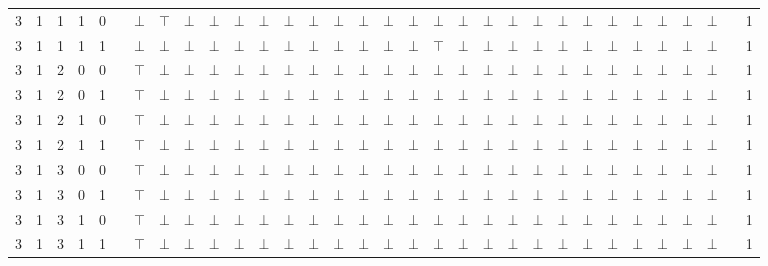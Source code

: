 \documentclass[12pt]{extarticle}
\begin{document}
\begin{landscape}
\begin{tiny}
\begin{longtable}[c]{llllllllllllllllllllllllllllllll}
3 & 1 & 1 & 1 & 0 &  & $\bot$ & $\top$ & $\bot$ & $\bot$ & $\bot$ & $\bot$ & $\bot$ & $\bot$ & $\bot$ & $\bot$ & $\bot$ & $\bot$ & $\bot$ & $\bot$ & $\bot$ & $\bot$ & $\bot$ & $\bot$ & $\bot$ & $\bot$ & $\bot$ & $\bot$ & $\bot$ & $\bot$ &  & 1 \\
3 & 1 & 1 & 1 & 1 &  & $\bot$ & $\bot$ & $\bot$ & $\bot$ & $\bot$ & $\bot$ & $\bot$ & $\bot$ & $\bot$ & $\bot$ & $\bot$ & $\bot$ & $\top$ & $\bot$ & $\bot$ & $\bot$ & $\bot$ & $\bot$ & $\bot$ & $\bot$ & $\bot$ & $\bot$ & $\bot$ & $\bot$ &  & 1 \\
3 & 1 & 2 & 0 & 0 &  & $\top$ & $\bot$ & $\bot$ & $\bot$ & $\bot$ & $\bot$ & $\bot$ & $\bot$ & $\bot$ & $\bot$ & $\bot$ & $\bot$ & $\bot$ & $\bot$ & $\bot$ & $\bot$ & $\bot$ & $\bot$ & $\bot$ & $\bot$ & $\bot$ & $\bot$ & $\bot$ & $\bot$ &  & 1 \\
3 & 1 & 2 & 0 & 1 &  & $\top$ & $\bot$ & $\bot$ & $\bot$ & $\bot$ & $\bot$ & $\bot$ & $\bot$ & $\bot$ & $\bot$ & $\bot$ & $\bot$ & $\bot$ & $\bot$ & $\bot$ & $\bot$ & $\bot$ & $\bot$ & $\bot$ & $\bot$ & $\bot$ & $\bot$ & $\bot$ & $\bot$ &  & 1 \\
3 & 1 & 2 & 1 & 0 &  & $\top$ & $\bot$ & $\bot$ & $\bot$ & $\bot$ & $\bot$ & $\bot$ & $\bot$ & $\bot$ & $\bot$ & $\bot$ & $\bot$ & $\bot$ & $\bot$ & $\bot$ & $\bot$ & $\bot$ & $\bot$ & $\bot$ & $\bot$ & $\bot$ & $\bot$ & $\bot$ & $\bot$ &  & 1 \\
3 & 1 & 2 & 1 & 1 &  & $\top$ & $\bot$ & $\bot$ & $\bot$ & $\bot$ & $\bot$ & $\bot$ & $\bot$ & $\bot$ & $\bot$ & $\bot$ & $\bot$ & $\bot$ & $\bot$ & $\bot$ & $\bot$ & $\bot$ & $\bot$ & $\bot$ & $\bot$ & $\bot$ & $\bot$ & $\bot$ & $\bot$ &  & 1 \\
3 & 1 & 3 & 0 & 0 &  & $\top$ & $\bot$ & $\bot$ & $\bot$ & $\bot$ & $\bot$ & $\bot$ & $\bot$ & $\bot$ & $\bot$ & $\bot$ & $\bot$ & $\bot$ & $\bot$ & $\bot$ & $\bot$ & $\bot$ & $\bot$ & $\bot$ & $\bot$ & $\bot$ & $\bot$ & $\bot$ & $\bot$ &  & 1 \\
3 & 1 & 3 & 0 & 1 &  & $\top$ & $\bot$ & $\bot$ & $\bot$ & $\bot$ & $\bot$ & $\bot$ & $\bot$ & $\bot$ & $\bot$ & $\bot$ & $\bot$ & $\bot$ & $\bot$ & $\bot$ & $\bot$ & $\bot$ & $\bot$ & $\bot$ & $\bot$ & $\bot$ & $\bot$ & $\bot$ & $\bot$ &  & 1 \\
3 & 1 & 3 & 1 & 0 &  & $\top$ & $\bot$ & $\bot$ & $\bot$ & $\bot$ & $\bot$ & $\bot$ & $\bot$ & $\bot$ & $\bot$ & $\bot$ & $\bot$ & $\bot$ & $\bot$ & $\bot$ & $\bot$ & $\bot$ & $\bot$ & $\bot$ & $\bot$ & $\bot$ & $\bot$ & $\bot$ & $\bot$ &  & 1 \\
3 & 1 & 3 & 1 & 1 &  & $\top$ & $\bot$ & $\bot$ & $\bot$ & $\bot$ & $\bot$ & $\bot$ & $\bot$ & $\bot$ & $\bot$ & $\bot$ & $\bot$ & $\bot$ & $\bot$ & $\bot$ & $\bot$ & $\bot$ & $\bot$ & $\bot$ & $\bot$ & $\bot$ & $\bot$ & $\bot$ & $\bot$ &  & 1 \\

\end{longtable}
\end{tiny}
\end{landscape}
\end{document}
